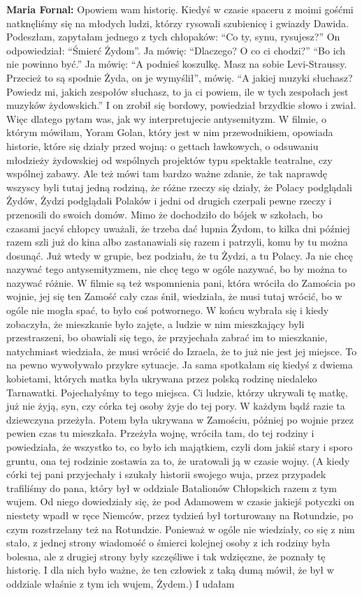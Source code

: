 \begin{otherlanguage}{polish}
\textbf{Maria Fornal:} Opowiem wam historię. Kiedyś w czasie spaceru z moimi gośćmi natknęliśmy się na młodych ludzi, którzy rysowali szubienicę i gwiazdy Dawida. Podeszłam, zapytałam jednego z tych chłopaków: "`Co ty, synu, rysujesz?"' On odpowiedział: "`Śmierć Żydom"'. Ja mówię: "`Dlaczego? O co ci chodzi?"' "`Bo ich nie powinno być."' Ja mówię: "`A podnieś koszulkę. Masz na sobie Levi-Straussy. Przecież to są spodnie Żyda, on je wymyślił"', mówię. "`A jakiej muzyki słuchasz? Powiedz mi, jakich zespołów słuchasz, to ja ci powiem, ile w tych zespołach jest muzyków żydowskich."' I on zrobił się bordowy, powiedział brzydkie słowo i zwiał. Więc dlatego pytam was, jak wy interpretujecie antysemityzm. W filmie, o którym mówiłam, Yoram Golan, który jest w nim przewodnikiem, opowiada historie, które się działy przed wojną: o gettach ławkowych, o odsuwaniu młodzieży żydowskiej od wspólnych projektów typu spektakle teatralne, czy wspólnej zabawy. Ale też mówi tam bardzo ważne zdanie, że tak naprawdę wszyscy byli tutaj jedną rodziną, że różne rzeczy się działy, że Polacy podglądali Żydów, Żydzi podglądali Polaków i jedni od drugich czerpali pewne rzeczy i przenosili do swoich domów. Mimo że dochodziło do bójek w szkołach, bo czasami jacyś chłopcy uważali, że trzeba dać łupnia Żydom, to kilka dni później razem szli już do kina albo zastanawiali się razem i patrzyli, komu by tu można dosunąć. Już wtedy w grupie, bez podziału, że tu Żydzi, a tu Polacy. Ja nie chcę nazywać tego antysemityzmem, nie chcę tego w ogóle nazywać, bo by można to nazywać różnie. W filmie są też wspomnienia pani, która wróciła do Zamościa po wojnie, jej się ten Zamość cały czas śnił, wiedziała, że musi tutaj wrócić, bo w ogóle nie mogła spać, to było coś potwornego. W końcu wybrała się i kiedy zobaczyła, że mieszkanie było zajęte, a ludzie w nim mieszkający byli przestraszeni, bo obawiali się tego, że przyjechała zabrać im to mieszkanie, natychmiast wiedziała, że musi wrócić do Izraela, że to już nie jest jej miejsce. To na pewno wywoływało przykre sytuacje. Ja sama spotkałam się kiedyś z dwiema kobietami, których matka była ukrywana przez polską rodzinę niedaleko Tarnawatki. Pojechałyśmy to tego miejsca. Ci ludzie, którzy ukrywali tę matkę, już nie żyją, syn, czy córka tej osoby żyje do tej pory. W każdym bądź razie ta dziewczyna przeżyła. Potem była ukrywana w Zamościu, później po wojnie przez pewien czas tu mieszkała. Przeżyła wojnę, wróciła tam, do tej rodziny i powiedziała, że wszystko to, co było ich majątkiem, czyli dom jakiś stary i sporo gruntu, ona tej rodzinie zostawia za to, że uratowali ją w czasie wojny. (A kiedy córki tej pani przyjechały i szukały historii swojego wuja, przez przypadek trafiliśmy do pana, który był w oddziale Batalionów Chłopskich razem z tym wujem. Od niego dowiedziały się, że pod Adamowem w czasie jakiejś potyczki on niestety wpadł w ręce Niemców, przez tydzień był torturowany na Rotundzie, po czym rozstrzelany też na Rotundzie. Ponieważ w ogóle nie wiedziały, co się z nim stało, z jednej strony wiadomość o śmierci kolejnej osoby z ich rodziny była bolesna, ale z drugiej strony były szczęśliwe i tak wdzięczne, że poznały tę historię. I dla nich było ważne, że ten człowiek z taką dumą mówił, że był w oddziale właśnie z tym ich wujem, Żydem.) I udałam 
\end{otherlanguage}
